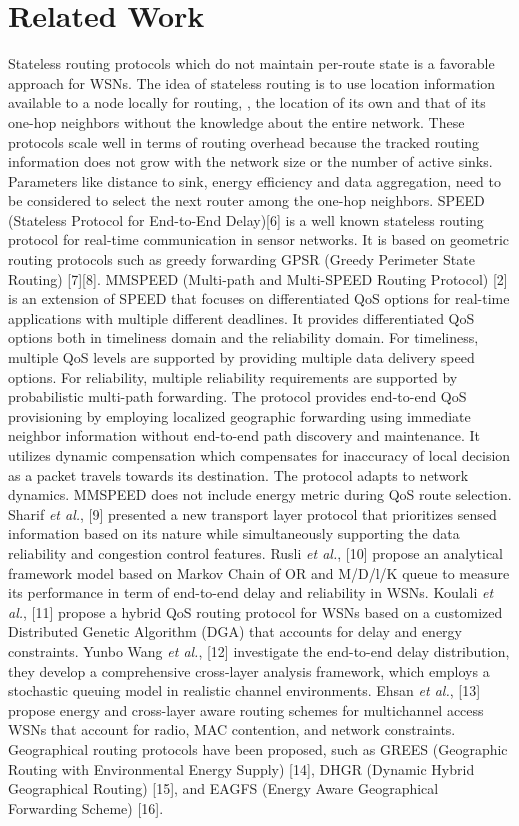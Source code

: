 \documentclass[fleqn,twoside]{article}
\begin{document}
 \section{Related Work}
\label{section:related work}
Stateless routing protocols which do not maintain per-route state is a favorable approach for WSNs. The idea of stateless routing is to use location information available to a node locally for routing, , the location of its own and that of its one-hop neighbors without the knowledge about the entire network. These protocols scale well in terms of routing overhead because the tracked routing information does not grow with the network size
or the number of active sinks. Parameters like distance to sink, energy efficiency and data aggregation, need to be considered to select the next router among the one-hop neighbors.
\vskip 2mm
SPEED (Stateless Protocol for End-to-End Delay)[6] is a well known stateless routing protocol for real-time communication in sensor networks. It is based on geometric routing protocols
such as greedy forwarding GPSR (Greedy Perimeter State Routing) [7][8]. 
MMSPEED (Multi-path and Multi-SPEED Routing Protocol) [2] is an extension of SPEED that focuses on differentiated QoS options for real-time applications with multiple different deadlines. It provides differentiated QoS options both in timeliness domain and the reliability domain. For timeliness, multiple QoS levels are supported by
providing multiple data delivery speed options. For reliability, multiple reliability requirements are supported by probabilistic multi-path forwarding. The protocol provides end-to-end QoS provisioning by employing localized geographic forwarding using immediate neighbor information without end-to-end path discovery and maintenance. It utilizes dynamic compensation which compensates for inaccuracy of local decision as a packet travels towards its destination. The protocol adapts to network dynamics. MMSPEED does not include energy metric during QoS route selection.  
\vskip 2mm
Sharif \emph{et al.}, [9] presented a new transport layer protocol that prioritizes sensed information based on its nature while simultaneously supporting the data reliability and congestion control features. Rusli \emph{et al.}, [10] propose an analytical framework model based on Markov Chain of OR and M/D/l/K queue to measure its performance in term of end-to-end delay and reliability in WSNs. 
\vskip 2mm
Koulali \emph{et al.}, [11] propose a hybrid QoS routing protocol for WSNs based on a customized Distributed Genetic Algorithm (DGA) that accounts for delay and energy constraints. Yunbo Wang \emph{et al.}, [12] investigate the end-to-end delay distribution, they develop a comprehensive cross-layer analysis framework, which employs a stochastic queuing model in realistic channel environments. Ehsan \emph{et al.}, [13] propose energy and cross-layer aware routing schemes for multichannel access WSNs that account for radio, MAC contention, and network constraints. Geographical routing protocols have been proposed, such as GREES (Geographic Routing with Environmental Energy Supply) [14], DHGR (Dynamic Hybrid Geographical Routing) [15], and EAGFS (Energy Aware Geographical Forwarding Scheme) [16].
\end{document}
